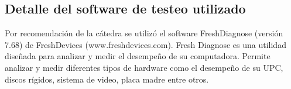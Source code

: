\subsection{Detalle del software de testeo utilizado}
Por recomendación de la cátedra se utilizó el software FreshDiagnose (versión 
7.68) de FreshDevices (www.freshdevices.com).
Fresh Diagnose es una utilidad diseñada para analizar y medir el desempeño de 
su computadora. Permite analizar y medir diferentes tipos de hardware como el 
desempeño de su UPC, discos rígidos, sistema de video, placa madre entre otros.


